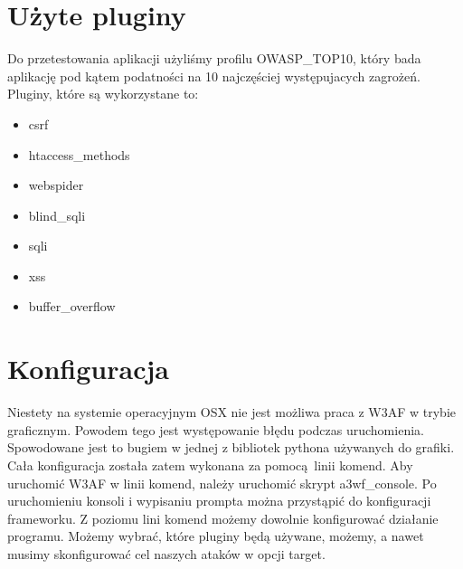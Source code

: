 \section{Użyte pluginy}

Do przetestowania aplikacji użyliśmy profilu OWASP\_TOP10, który bada aplikację pod kątem podatności na 10 najczęściej występujacych zagrożeń. Pluginy, które są wykorzystane to:
\begin{itemize}
\item csrf
\item htaccess\_methods
\item webspider
\item blind\_sqli
\item sqli
\item xss
\item buffer\_overflow
\end{itemize}

\section{Konfiguracja}

Niestety na systemie operacyjnym OSX nie jest możliwa praca z W3AF w trybie graficznym. Powodem tego jest występowanie błędu podczas uruchomienia. Spowodowane jest to bugiem w jednej z bibliotek pythona używanych do grafiki. Cała konfiguracja została zatem wykonana za pomocą linii komend. Aby uruchomić W3AF w linii komend, należy uruchomić skrypt a3wf\_console. Po uruchomieniu konsoli i wypisaniu prompta można przystąpić do konfiguracji frameworku. Z poziomu lini komend możemy dowolnie konfigurować działanie programu. Możemy wybrać, które pluginy będą używane, możemy, a nawet musimy skonfigurować cel naszych ataków w opcji target.
\noindent
\begin{minipage}{\linewidth}
\label{erd}
\end{minipage}

